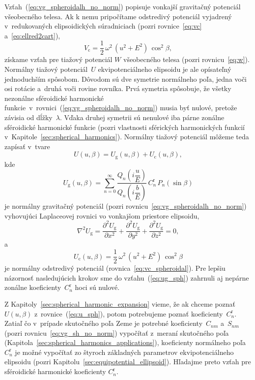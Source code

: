 \documentclass[a4paper, 12pt]{book}
\newcommand{\gidx}{\mathrm g}
\newcommand{\cidx}{\mathrm c}
\begin{document}
Vzťah~(\ref{eq:vg_spheroidalh_no_norm}) popisuje vonkajší gravitačný potenciál 
všeobecného telesa.  Ak k nemu pripočítame odstredivý potenciál vyjadrený 
v~redukovaných elipsoidických súradniciach (pozri rovnice~\ref{eq:vc} 
a~\ref{eq:ellred2cart}),
%
\begin{equation}
\label{eq:vc_spheroidal}
V_\cidx = \frac{1}{2} \, \omega^2 \, (u^2 + E^2) \, \cos^2\beta{,}
\end{equation}
%
získame vzťah pre tiažový potenciál $W$ všeobecného telesa (pozri 
rovnicu~\ref{eq:w}).  Normálny tiažový potenciál~$U$ ekvipotenciálneho 
elipsoidu je ale opísateľný jednoduchším spôsobom.  Dôvodom sú dve symetrie 
normálneho poľa, jedna voči osi rotácie a~druhá voči rovine rovníka.  Prvá 
symetria spôsobuje, že všetky nezonálne sféroidické harmonické 
funkcie~v~rovnici~(\ref{eq:vg_spheroidalh_no_norm}) musia byť nulové, pretože 
závisia od dĺžky~$\lambda$.  Vďaka druhej symetrii sú nenulové iba párne 
zonálne sféroidické harmonické funkcie (pozri vlastnosti sférických 
harmonických funkcií v~Kapitole~\ref{sec:spherical_harmonics}).  Normálny 
tiažový potenciál môžeme teda zapísať v~tvare
%
\begin{equation}
\label{eq:u_sph}
U(u, \beta) = U_\gidx(u, \beta) + U_\cidx(u, \beta){,}
\end{equation}
%
kde
%
\begin{equation}
\label{eq:ug_sph}
U_\gidx(u, \beta) = \sum_{n = 0}^\infty \frac{Q_n\left( i \dfrac{u}{E} 
\right)}{Q_n\left( i \dfrac{b}{E} \right)} \,  C^{\mathrm{r}}_n \, 
P_n(\sin\beta)
\end{equation}
%
je normálny gravitačný potenciál (pozri 
rovnicu~\ref{eq:vg_spheroidalh_no_norm}) vyhovujúci Laplaceovej rovnici vo 
vonkajšom priestore elipsoidu,
%
\begin{equation}
\label{eq:ug_laplace_cart}
\nabla^2 U_\gidx = \frac{\partial^2 U_\gidx}{\partial x^2} + \frac{\partial^2 
U_\gidx}{\partial y^2} + \frac{\partial^2 U_\gidx}{\partial z^2} = 0{,}
\end{equation}
%
a
%
\begin{equation}
\label{eq:uc_sph}
U_\cidx(u, \beta) = \frac{1}{2} \, \omega^2 \, (u^2 + E^2) \, \cos^2\beta
\end{equation}
%
je normálny odstredivý potenciál (rovnica~\ref{eq:vc_spheroidal}).  Pre lepšiu 
názornosť nasledujúcich krokov sme do vzťahu~(\ref{eq:ug_sph}) zahrnuli aj 
nepárne zonálne koeficienty~$C^{\mathrm{r}}_n$ hoci sú nulové.

Z Kapitoly~\ref{sec:spherical_harmonic_expansion} vieme, že ak chceme poznať 
$U(u,\beta)$ z~rovnice~(\ref{eq:u_sph}), potom potrebujeme poznať 
koeficienty~$C_n^\mathrm{r}$.  Zatiaľ čo v~prípade skutočného poľa Zeme je 
potrebné koeficienty~$C_{nm}$ a~$S_{nm}$ (pozri rovnicu~\ref{eq:vg_sh_no_norm}) 
vypočítať z~meraní skutočného poľa 
(Kapitola~\ref{sec:spherical_harmonics_applications}), koeficienty normálneho 
poľa $C_n^\mathrm{r}$ je možné vypočítať zo štyroch základných parametrov 
ekvipotenciálneho elipsoidu (pozri Kapitolu~\ref{sec:equipotential_ellipsoid}).  
Hľadajme preto vzťah pre sféroidické harmonické koeficienty $C_n^\mathrm{r}$.
\end{document}
